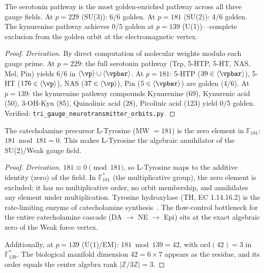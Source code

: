 \begin{theorem}
\label{thm:serotonin_golden}
The serotonin pathway is the most golden-enriched pathway across all three gauge fields. At $p = 229$ (SU(3)): 6/6 golden. At $p = 181$ (SU(2)): 4/6 golden. The kynurenine pathway achieves 0/5 golden at $p = 139$ (U(1))---complete exclusion from the golden orbit at the electromagnetic vertex.
\begin{proof}
\emph{Derivation.} By direct computation of molecular weights modulo each gauge prime. At $p=229$: the full serotonin pathway (Trp, 5-HTP, 5-HT, NAS, Mel, Pin) yields 6/6 in $\langle\vp\rangle \cup \langle\vpbar\rangle$. At $p=181$: 5-HTP ($39 \in \langle\vpbar\rangle$), 5-HT ($176 \in \langle\vp\rangle$), NAS ($37 \in \langle\vp\rangle$), Pin ($5 \in \langle\vpbar\rangle$) are golden (4/6). At $p=139$: the kynurenine pathway compounds Kynurenine (69), Kynurenic acid (50), 3-OH-Kyn (85), Quinolinic acid (28), Picolinic acid (123) yield 0/5 golden. Verified: \texttt{tri\_gauge\_neurotransmitter\_orbits.py}.
\qedhere
\end{proof}
\end{theorem}

\begin{theorem}
\label{thm:tyrosine_annihilation}
The catecholamine precursor L-Tyrosine (MW $= 181$) is the zero element in $\mathbb{F}_{181}$: $181 \bmod 181 = 0$. This makes L-Tyrosine the algebraic annihilator of the SU(2)/Weak gauge field.
\begin{proof}
\emph{Derivation.} $181 \equiv 0 \pmod{181}$, so L-Tyrosine maps to the additive identity (zero) of the field. In $\mathbb{F}_{181}^*$ (the multiplicative group), the zero element is excluded: it has no multiplicative order, no orbit membership, and annihilates any element under multiplication. Tyrosine hydroxylase (TH, EC 1.14.16.2) is the rate-limiting enzyme of catecholamine synthesis~\cite{nagatsu64}. The flow-control bottleneck for the entire catecholamine cascade (DA $\to$ NE $\to$ Epi) sits at the exact algebraic zero of the Weak force vertex.

Additionally, at $p = 139$ (U(1)/EM): $181 \bmod 139 = 42$, with $\mathrm{ord}(42) = 3$ in $\mathbb{F}_{139}^*$. The biological manifold dimension $42 = 6 \times 7$ appears as the residue, and its order equals the center algebra rank $|\mathbb{Z}/3\mathbb{Z}| = 3$.
\qedhere
\end{proof}
\end{theorem}

